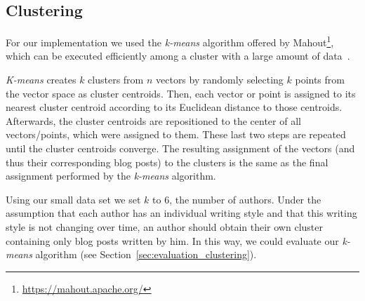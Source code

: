\subsection{Clustering}
\label{sec:impl_clustering}

For our implementation we used the \textit{k-means} algorithm offered by Mahout\footnote{\url{https://mahout.apache.org/}}, which can be executed efficiently among a cluster with a large amount of data~\cite{esteves2011k}.


\textit{K-means} creates $k$ clusters from $n$ vectors by randomly selecting $k$ points from the vector space as cluster centroids.
Then, each vector or point is assigned to its nearest cluster centroid according to its Euclidean distance to those centroids.
Afterwards, the cluster centroids are repositioned to the center of all vectors/points, which were assigned to them.
These last two steps are repeated until the cluster centroids converge.
The resulting assignment of the vectors (and thus their corresponding blog posts) to the clusters is the same as the final assignment performed by the \textit{k-means} algorithm.


Using our small data set we set $k$ to 6, the number of authors.
Under the assumption that each author has an individual writing style and that this writing style is not changing over time, an author should obtain their own cluster containing only blog posts written by him.
In this way, we could evaluate our \textit{k-means} algorithm (see Section~\ref{sec:evaluation_clustering}).


